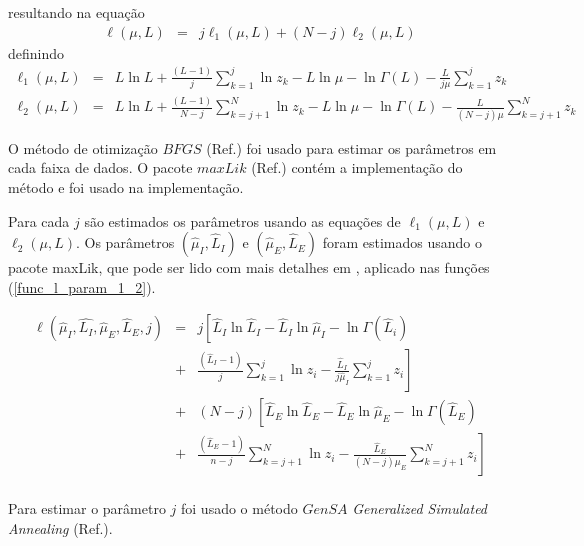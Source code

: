 \documentclass[remotesensing,article,submit,moreauthors,pdftex]{Definitions/mdpi}
\begin{document}
 resultando na equação
\begin{equation}\nonumber
\begin{array}{ccc}  
  \ell(\mu, L)&=&j\ell_1(\mu, L) + (N - j)\ell_2(\mu, L)
 \end{array}
 \end{equation}
definindo
 \begin{equation}
\begin{array}{ccc}\label{func_l_param_1_2}
    \ell_1(\mu, L)&=&L\ln L+\frac{(L-1)}{j}\sum_{k=1}^{j}\ln z_k-L\ln\mu-\ln\Gamma(L) -\frac{L}{j\mu}\sum_{k=1}^{j} z_k\\
    \ell_2(\mu, L)&=&L\ln L+\frac{(L-1)}{N-j}\sum_{k=j+1}^{N}\ln z_k-L\ln\mu-\ln\Gamma(L) -\frac{L}{(N-j)\mu}\sum_{k=j+1}^{N} z_k
 \end{array}
 \end{equation}
 
O método de otimização $BFGS$ (Ref.\cite{nw_2006}) foi usado para estimar os parâmetros em cada faixa de dados. O pacote $maxLik$ (Ref.\cite{ht_2011}) contém a implementação do método e foi usado na implementação.
 
Para cada $j$ são estimados os parâmetros usando as equações de $\ell_1(\mu, L)$ e $\ell_2(\mu, L)$. Os parâmetros $(\hat{\mu}_I, \hat{L}_I)$ e $(\hat{\mu}_E, \hat{L}_E)$ foram estimados usando o pacote maxLik, que pode ser lido com mais detalhes em \cite{ht_2011}, aplicado nas funções (\ref{func_l_param_1_2}).


\begin{equation}\label{cap_acf_16}
 \begin{array}{lll}
\ell(\hat{\mu}_I, \hat{L_I},\hat{\mu}_E, \hat{L}_E, j)&=&j\left[  \hat{L}_I\ln \hat{L}_I -\hat{L}_I \ln \hat{\mu}_I -\ln \Gamma(\hat{L}_i) \right. \\
&+& \left.\frac{(\hat{L}_I  - 1)}{j} \sum_{k=1}^{j}  \ln z_{i}  -\frac{\hat{L}_I}{j\hat{\mu}_I} \sum_{k=1}^{j}   z_i\right] \\
                                               &+&(N-j)\left[\hat{L}_E\ln \hat{L}_E -\hat{L}_E \ln \hat{\mu}_E-\ln \Gamma(\hat{L}_E)\right. \\
                                               &+&\left. \frac{(\hat{L}_E - 1)}{n-j} \sum_{k=j+1}^{N}\ln z_{i}-\frac{\hat{L}_E}{(N-j)\mu_E} \sum_{k=j+1}^{N}z_i\right] \\
 \end{array}
 \end{equation}

Para estimar o  parâmetro $j$ foi usado o método $GenSA$ \textit{Generalized Simulated Annealing} (Ref.\cite{xgsh}).
\end{document}
